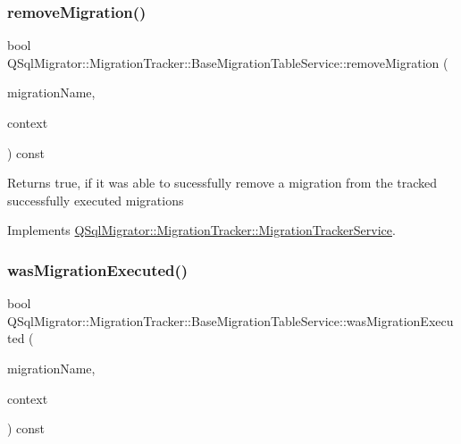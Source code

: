 \subsubsection{\texorpdfstring{remove\+Migration()}{removeMigration()}}
{\footnotesize\ttfamily bool Q\+Sql\+Migrator\+::\+Migration\+Tracker\+::\+Base\+Migration\+Table\+Service\+::remove\+Migration (\begin{DoxyParamCaption}\item[{const Q\+String \&}]{migration\+Name,  }\item[{const \hyperlink{class_q_sql_migrator_1_1_command_execution_1_1_command_execution_context}{Command\+Execution\+::\+Command\+Execution\+Context} \&}]{context }\end{DoxyParamCaption}) const\hspace{0.3cm}{\ttfamily [virtual]}}

\begin{DoxyReturn}{Returns}
true, if it was able to sucessfully remove a migration from the tracked successfully executed migrations 
\end{DoxyReturn}


Implements \hyperlink{class_q_sql_migrator_1_1_migration_tracker_1_1_migration_tracker_service_a3041c2cb0027e6a40639ce4c47482c17}{Q\+Sql\+Migrator\+::\+Migration\+Tracker\+::\+Migration\+Tracker\+Service}.

\mbox{\label{class_q_sql_migrator_1_1_migration_tracker_1_1_base_migration_table_service_afaa1f00b646de9db114a82597a40f9ea}} 
\subsubsection{\texorpdfstring{was\+Migration\+Executed()}{wasMigrationExecuted()}}
{\footnotesize\ttfamily bool Q\+Sql\+Migrator\+::\+Migration\+Tracker\+::\+Base\+Migration\+Table\+Service\+::was\+Migration\+Executed (\begin{DoxyParamCaption}\item[{const Q\+String \&}]{migration\+Name,  }\item[{const \hyperlink{class_q_sql_migrator_1_1_command_execution_1_1_command_execution_context}{Command\+Execution\+::\+Command\+Execution\+Context} \&}]{context }\end{DoxyParamCaption}) const\hspace{0.3cm}{\ttfamily [virtual]}}

